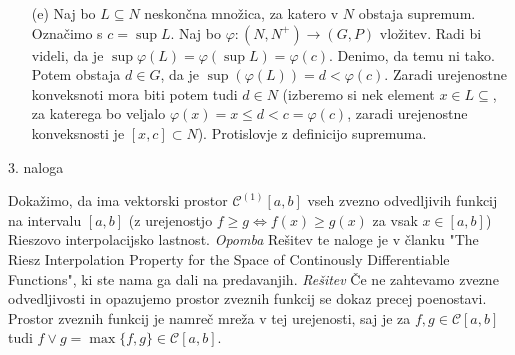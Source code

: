 \documentclass[a4paper, 12pt]{article}
\begin{document}
\begin{enumerate}
\item[(e)] Naj bo $L\subseteq N$ neskončna množica, za katero v $N$ obstaja supremum. Označimo s $c=\sup L$. Naj bo $\varphi : (N,N^+)\rightarrow (G,P)$ vložitev. Radi bi videli, da je $\sup \varphi(L) = \varphi(\sup L)= \varphi(c)$. Denimo, da temu ni tako. Potem obstaja $d\in G$, da je $\sup (\varphi(L)) =d < \varphi(c)$. Zaradi urejenostne konveksnoti mora biti potem tudi $d\in N$ (izberemo si nek element $x\in L\subseteq$, za katerega bo veljalo $\varphi(x)=x \le d < c = \varphi(c)$, zaradi urejenostne konveksnosti je $[x,c] \subset N$). Protislovje z definicijo supremuma.

\end{enumerate}

\begin{flushleft}
3. naloga
\end{flushleft}
Dokažimo, da ima vektorski prostor $\mathcal{C}^{(1)} [a,b]$ vseh zvezno odvedljivih funkcij na intervalu $[a,b]$ (z urejenostjo $f\ge g \Leftrightarrow f(x) \ge g(x)$ za vsak $x\in [a,b]$) Rieszovo interpolacijsko lastnost.
\newline
\emph{Opomba}
\newline
Rešitev te naloge je v članku "The Riesz Interpolation Property for the Space of Continously Differentiable Functions", ki ste nama ga dali na predavanjih. 
\newline
\emph{Rešitev}
\newline
Če ne zahtevamo zvezne odvedljivosti in opazujemo prostor zveznih funkcij se dokaz precej poenostavi. Prostor zveznih funkcij je namreč mreža v tej urejenosti, saj je za $f,g\in \mathcal{C}[a,b]$ tudi $f\lor g = \max\{f,g\} \in \mathcal{C}[a,b] $.
\end{document}

